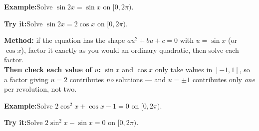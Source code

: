 \documentclass[12pt]{article}
\begin{document}
\begin{examplebox}
\textbf{Example:}\quad Solve $\sin 2x = \sin x$ on $[0, 2\pi)$.
\end{examplebox}

\begin{tryitbox}
\textbf{Try it:}\quad Solve $\sin 2x = 2\cos x$ on $[0, 2\pi)$.\\[2pt]
\end{tryitbox}


\begin{formulabox}
\textbf{Method:} if the equation has the shape $au^2 + bu + c = 0$ with
$u = \sin x$ (or $\cos x$), factor it exactly as you would an ordinary quadratic,
then solve each factor.\\[2pt]
\textbf{Then check each value of $u$:} $\sin x$ and $\cos x$ only take values in
$[-1, 1]$, so a factor giving $u = 2$ contributes \emph{no} solutions --- and
$u = \pm 1$ contributes only \emph{one} per revolution, not two.
\end{formulabox}

\begin{examplebox}
\textbf{Example:}\quad Solve $2\cos^2 x + \cos x - 1 = 0$ on $[0, 2\pi)$.
\end{examplebox}

\begin{tryitbox}
\textbf{Try it:}\quad Solve $2\sin^2 x - \sin x = 0$ on $[0, 2\pi)$.\\[2pt]
\end{tryitbox}

\end{document}
